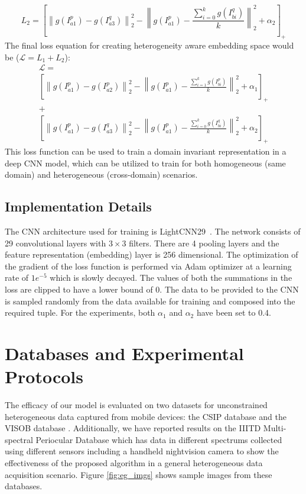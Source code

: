 \documentclass[10pt,twocolumn,letterpaper]{article}
\begin{document}
\begin{equation}
  \label{eqn:cov_hetro_triplet}
	L_{2} =  \left [\left \| g(I_{a1}^p) - g(I_{a3}^q) \right \|^2_2 - \left \| g(I_{a1}^p) - \frac{\sum_{i=0}^kg(I_{bi}^q)}{k}  \right \|^2_2   + \alpha_2 \right]_+
\end{equation}
The final loss equation for creating heterogeneity aware embedding space would be ($\mathcal{L} = L_{1} + L_{2} $):
\vspace{-20pt}
\begin{multline}
	\label{eqn:final_x_loss}
    \mathcal{L} = \\
    \left[ \left \| g(I_{a1}^p) - g(I_{a2}^p) \right \|^2_2 - \left \| g(I_{a1}^p) - \frac{\sum_{i=1}^kg(I_{bi}^p)}{k} \right \|^2_2   + \alpha_1 \right]_+ \\ 
    + \\
    \left[ \left \| g(I_{a1}^p) - g(I_{a3}^q) \right \|^2_2 - \left \| g(I_{a1}^p) - \frac{\sum_{i=0}^kg(I_{bi}^q)}{k}  \right \|^2_2   + \alpha_2 \right]_+
\end{multline}
This loss function can be used to train a domain invariant representation in a deep CNN model, which can be utilized to train for both homogeneous (same domain) and heterogeneous (cross-domain) scenarios. 

\subsection{Implementation Details}
The CNN architecture used for training is LightCNN29~\cite{wu2018light}. The network consists of 29 convolutional layers with $3 \times 3$ filters. There are 4 pooling layers and the feature representation (embedding) layer is 256 dimensional. 
The optimization of the gradient of the loss function is performed via Adam optimizer \cite{kingma2014adam} at a learning rate of $1e^{-5}$ which is slowly decayed. The values of both the summations in the loss are clipped to have a lower bound of 0. The data to be provided to the CNN is sampled randomly from the data available for training and composed into the required tuple. For the experiments, both $\alpha_1$ and $\alpha_2$ have been set to 0.4. 

\section{Databases and Experimental Protocols}
\label{sec:dbase}
  \vspace{-4pt}
The efficacy of our model is evaluated on two datasets for unconstrained heterogeneous data captured from mobile devices: the CSIP database \cite{santos2015fusing} and the VISOB database \cite{VISOB_Dataset}. Additionally, we have reported results on the IIITD Multi-spectral Periocular Database \cite{sharma2014cross} which has data in different spectrums collected using different sensors including a handheld nightvision camera to show the effectiveness of the proposed algorithm in a general heterogeneous data acquisition scenario. Figure \ref{fig:eg_imgs} shows sample images from these databases.
\end{document}
